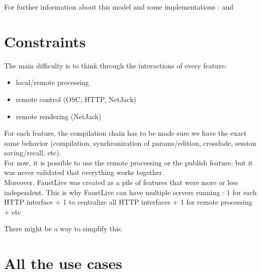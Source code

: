\documentclass[a4paper]{article}
\begin{document}
For further information about this model and some implementations : \cite{CCC} and \cite{FaustLive} 





\newpage
\section{Constraints}\label{constraints}

The main difficulty is to think through the interactions of every feature:
\begin{itemize}
\item local/remote processing
\item remote control (OSC, HTTP, NetJack)
\item remote rendering (NetJack)
\end{itemize}

For each feature, the compilation chain has to be made sure we have the exact same behavior (compilation, synchronization of params/edition, crossfade, session saving/recall, etc). \\

For now, it is possible to use the remote processing or the publish feature, but it was never validated that everything works together. \\

Moreover, FaustLive was created as a pile of features that were more or less independent. This is why FaustLive can have multiple servers running : 1 for each HTTP interface + 1 to centralize all HTTP interfaces + 1 for remote processing + etc

There might be a way to simplify this. 

\newpage
\section{All the use cases}

\end{document}
